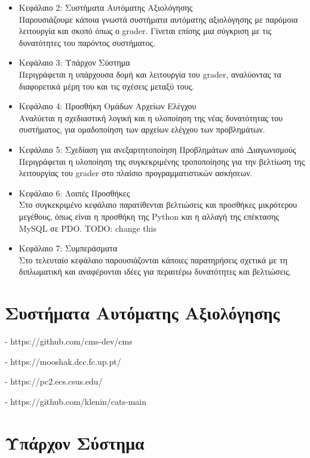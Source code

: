 \documentclass[diploma]{softlab-thesis}
\begin{document}
\begin{itemize}
  \item Κεφάλαιο 2: Συστήματα Αυτόματης Αξιολόγησης \\
    Παρουσιάζουμε κάποια γνωστά συστήματα αυτόματης αξιολόγησης με παρόμοια
    λειτουργία και σκοπό όπως ο grader. Γίνεται επίσης μια σύγκριση με τις
    δυνατότητες του παρόντος συστήματος.
  \item Κεφάλαιο 3: Υπάρχον Σύστημα \\
    Περιγράφεται η υπάρχουσα δομή και λειτουργία του grader, αναλύοντας τα
    διαφορετικά μέρη του και τις σχέσεις μεταξύ τους.
  \item Κεφάλαιο 4: Προσθήκη Ομάδων Αρχείων Ελέγχου \\
    Αναλύεται η σχεδιαστική λογική και η υλοποίηση της νέας δυνατότητας του
    συστήματος, για ομαδοποίηση των αρχείων ελέγχου των προβλημάτων.
  \item Κεφάλαιο 5: Σχεδίαση για ανεξαρτητοποίηση Προβλημάτων από Διαγωνισμούς \\
    Περιγράφεται η υλοποίηση της συγκεκριμένης τροποποίησης για την βελτίωση της
    λειτουργίας του grader στο πλαίσιο προγραμματιστικών ασκήσεων.
  \item Κεφάλαιο 6: Λοιπές Προσθήκες \\
    Στο συγκεκριμένο κεφάλαιο παρατίθενται βελτιώσεις και προσθήκες μικρότερου
    μεγέθους, όπως είναι η προσθήκη της Python και η αλλαγή της επέκτασης
    MySQL σε PDO.
    TODO: change this
  \item Κεφάλαιο 7: Συμπεράσματα \\
    Στο τελευταίο κεφάλαιο παρουσιάζονται κάποιες παρατηρήσεις σχετικά με τη
    διπλωματική και αναφέρονται ιδέες για περαιτέρω δυνατότητες και βελτιώσεις.
\end{itemize}


\chapter{Συστήματα Αυτόματης Αξιολόγησης}

- https://github.com/cms-dev/cms

- https://mooshak.dcc.fc.up.pt/

- https://pc2.ecs.csus.edu/

- https://github.com/klenin/cats-main

\chapter{Υπάρχον Σύστημα}
\end{document}
